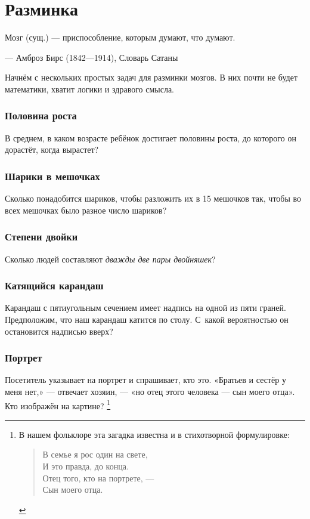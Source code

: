 \chapter{Разминка}

\setlength{\epigraphwidth}{.80\textwidth}
\epigraph{Мозг (сущ.) --- приспособление, которым думают, что думают.}{--- Амброз Бирс (1842---1914), Словарь Сатаны}

Начнём с нескольких простых задач для разминки мозгов.
В них почти не будет математики, хватит логики и здравого смысла.

\subsection*{Половина роста}


В среднем, в каком возрасте ребёнок достигает половины роста, до которого он дорастёт, когда вырастет?

\subsection*{Шарики в мешочках}

Сколько понадобится шариков, чтобы разложить их в 15 мешочков так,
чтобы во всех мешочках было разное число шариков?

\subsection*{Степени двойки}

Сколько людей составляют \emph{дважды две пары двойняшек}?

\subsection*{Катящийся карандаш}

Карандаш с пятиугольным сечением имеет надпись на одной из пяти граней.
Предположим, что наш карандаш катится по столу.
С~какой вероятностью он остановится надписью вверх?

\subsection*{Портрет}

Посетитель указывает на портрет и спрашивает, кто это. 
«Братьев и сестёр у меня нет,» --- отвечает хозяин, --- «но отец этого человека --- сын моего отца».
Кто изображён на картине?%
\footnote{В нашем фольклоре эта загадка известна и в стихотворной формулировке:\\
\begin{verse}
В семье я рос один на свете,\\
И это правда, до конца.\\
Отец того, кто на портрете, ---\\
Сын моего отца.
\end{verse}
\pr}



